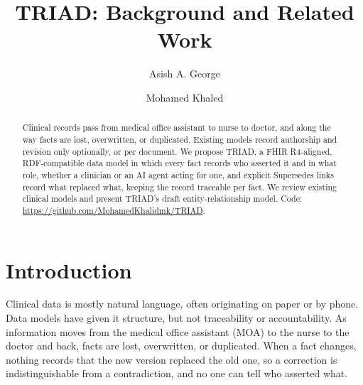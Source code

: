 \documentclass[sigconf]{acmart}
\begin{document}
\title{TRIAD: Background and Related Work}

\author{Asish A. George}

\author{Mohamed Khaled}

\begin{abstract}
\raggedright
Clinical records pass from medical office assistant to nurse to doctor, and along the way facts are lost, overwritten, or duplicated. Existing models record authorship and revision only optionally, or per document. We propose TRIAD, a FHIR R4-aligned, RDF-compatible data model in which every fact records who asserted it and in what role, whether a clinician or an AI agent acting for one, and explicit Supersedes links record what replaced what, keeping the record traceable per fact. We review existing clinical models and present TRIAD's draft entity-relationship model.
Code: \url{https://github.com/MohamedKhalidmk/TRIAD}.
\end{abstract}

\maketitle
\pagestyle{empty}

\section{Introduction}
Clinical data is mostly natural language, often originating on paper or by phone. Data models have given it structure, but not traceability or accountability. As information moves from the medical office assistant (MOA) to the nurse to the doctor and back, facts are lost, overwritten, or duplicated. When a fact changes, nothing records that the new version replaced the old one, so a correction is indistinguishable from a contradiction, and no one can tell who asserted what.
\end{document}

